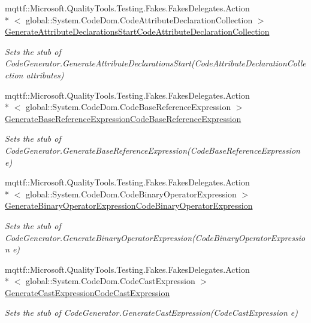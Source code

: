 \begin{DoxyCompactItemize}
mqttf\-::\-Microsoft.\-Quality\-Tools.\-Testing.\-Fakes.\-Fakes\-Delegates.\-Action\\*
$<$ global\-::\-System.\-Code\-Dom.\-Code\-Attribute\-Declaration\-Collection $>$ \hyperlink{class_system_1_1_code_dom_1_1_compiler_1_1_fakes_1_1_stub_code_compiler_a33f019171fcad21c62cf41b8e7fa40d1}{Generate\-Attribute\-Declarations\-Start\-Code\-Attribute\-Declaration\-Collection}
\begin{DoxyCompactList}\small\item\em Sets the stub of Code\-Generator.\-Generate\-Attribute\-Declarations\-Start(\-Code\-Attribute\-Declaration\-Collection attributes)\end{DoxyCompactList}\item 
mqttf\-::\-Microsoft.\-Quality\-Tools.\-Testing.\-Fakes.\-Fakes\-Delegates.\-Action\\*
$<$ global\-::\-System.\-Code\-Dom.\-Code\-Base\-Reference\-Expression $>$ \hyperlink{class_system_1_1_code_dom_1_1_compiler_1_1_fakes_1_1_stub_code_compiler_a96e3b05301c833896247f44cff56c426}{Generate\-Base\-Reference\-Expression\-Code\-Base\-Reference\-Expression}
\begin{DoxyCompactList}\small\item\em Sets the stub of Code\-Generator.\-Generate\-Base\-Reference\-Expression(\-Code\-Base\-Reference\-Expression e)\end{DoxyCompactList}\item 
mqttf\-::\-Microsoft.\-Quality\-Tools.\-Testing.\-Fakes.\-Fakes\-Delegates.\-Action\\*
$<$ global\-::\-System.\-Code\-Dom.\-Code\-Binary\-Operator\-Expression $>$ \hyperlink{class_system_1_1_code_dom_1_1_compiler_1_1_fakes_1_1_stub_code_compiler_a583a6c68f093312b3180b65f6382f067}{Generate\-Binary\-Operator\-Expression\-Code\-Binary\-Operator\-Expression}
\begin{DoxyCompactList}\small\item\em Sets the stub of Code\-Generator.\-Generate\-Binary\-Operator\-Expression(\-Code\-Binary\-Operator\-Expression e)\end{DoxyCompactList}\item 
mqttf\-::\-Microsoft.\-Quality\-Tools.\-Testing.\-Fakes.\-Fakes\-Delegates.\-Action\\*
$<$ global\-::\-System.\-Code\-Dom.\-Code\-Cast\-Expression $>$ \hyperlink{class_system_1_1_code_dom_1_1_compiler_1_1_fakes_1_1_stub_code_compiler_a95ad5964419dd7cf63cc21aa09b10c6d}{Generate\-Cast\-Expression\-Code\-Cast\-Expression}
\begin{DoxyCompactList}\small\item\em Sets the stub of Code\-Generator.\-Generate\-Cast\-Expression(\-Code\-Cast\-Expression e)\end{DoxyCompactList}\item 

\end{DoxyCompactItemize}
